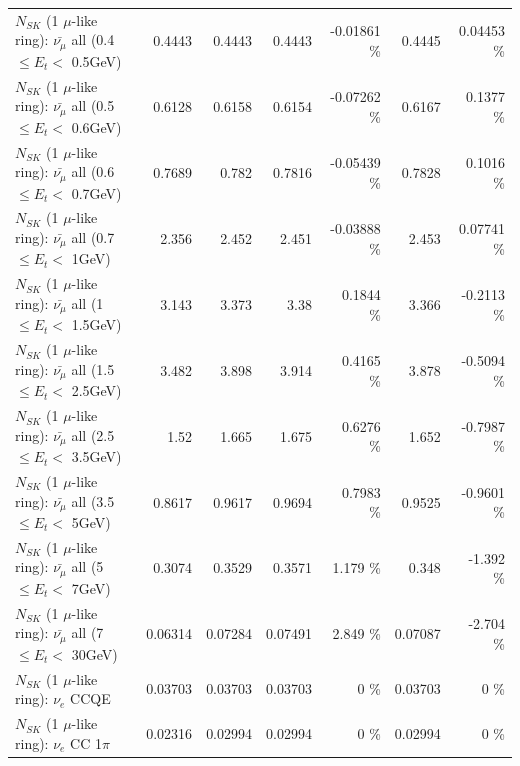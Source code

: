 \begin{table}
\begin{tabular}{| l | r | r | r  r | r  r |}
 $N_{SK}$ (1 $\mu$-like ring): $\bar{\nu_{\mu}}$ all (0.4 $\leq E_{t} <$ 0.5GeV) &          0.4443 &          0.4443 &          0.4443 & -0.01861 \%  &          0.4445 &  0.04453 \%  \\ 
 $N_{SK}$ (1 $\mu$-like ring): $\bar{\nu_{\mu}}$ all (0.5 $\leq E_{t} <$ 0.6GeV) &          0.6128 &          0.6158 &          0.6154 & -0.07262 \%  &          0.6167 &   0.1377 \%  \\ 
 $N_{SK}$ (1 $\mu$-like ring): $\bar{\nu_{\mu}}$ all (0.6 $\leq E_{t} <$ 0.7GeV) &          0.7689 &           0.782 &          0.7816 & -0.05439 \%  &          0.7828 &   0.1016 \%  \\ 
   $N_{SK}$ (1 $\mu$-like ring): $\bar{\nu_{\mu}}$ all (0.7 $\leq E_{t} <$ 1GeV) &           2.356 &           2.452 &           2.451 & -0.03888 \%  &           2.453 &  0.07741 \%  \\ 
   $N_{SK}$ (1 $\mu$-like ring): $\bar{\nu_{\mu}}$ all (1 $\leq E_{t} <$ 1.5GeV) &           3.143 &           3.373 &            3.38 &   0.1844 \%  &           3.366 &  -0.2113 \%  \\ 
 $N_{SK}$ (1 $\mu$-like ring): $\bar{\nu_{\mu}}$ all (1.5 $\leq E_{t} <$ 2.5GeV) &           3.482 &           3.898 &           3.914 &   0.4165 \%  &           3.878 &  -0.5094 \%  \\ 
 $N_{SK}$ (1 $\mu$-like ring): $\bar{\nu_{\mu}}$ all (2.5 $\leq E_{t} <$ 3.5GeV) &            1.52 &           1.665 &           1.675 &   0.6276 \%  &           1.652 &  -0.7987 \%  \\ 
   $N_{SK}$ (1 $\mu$-like ring): $\bar{\nu_{\mu}}$ all (3.5 $\leq E_{t} <$ 5GeV) &          0.8617 &          0.9617 &          0.9694 &   0.7983 \%  &          0.9525 &  -0.9601 \%  \\ 
     $N_{SK}$ (1 $\mu$-like ring): $\bar{\nu_{\mu}}$ all (5 $\leq E_{t} <$ 7GeV) &          0.3074 &          0.3529 &          0.3571 &    1.179 \%  &           0.348 &   -1.392 \%  \\ 
    $N_{SK}$ (1 $\mu$-like ring): $\bar{\nu_{\mu}}$ all (7 $\leq E_{t} <$ 30GeV) &         0.06314 &         0.07284 &         0.07491 &    2.849 \%  &         0.07087 &   -2.704 \%  \\ 
\hline
\hline
\hline
                                      $N_{SK}$ (1 $\mu$-like ring): $\nu_e$ CCQE &         0.03703 &         0.03703 &         0.03703 &        0 \%  &         0.03703 &        0 \%  \\ 
                                 $N_{SK}$ (1 $\mu$-like ring): $\nu_e$ CC 1$\pi$ &         0.02316 &         0.02994 &         0.02994 &        0 \%  &         0.02994 &        0 \%  \\ 

\end{tabular}
\end{table}
